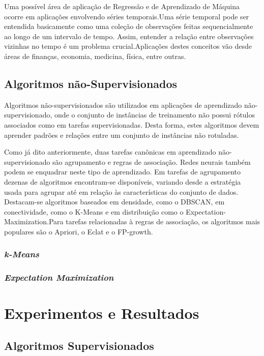 \documentclass{article}
\begin{document}
Uma possível área de aplicação de Regressão e de Aprendizado de Máquina ocorre em aplicações envolvendo séries temporais.Uma série temporal pode ser entendida basicamente como uma coleção de observações feitas sequencialmente ao longo de um intervalo de tempo. Assim, entender a relação entre observações vizinhas no tempo é um problema crucial.Aplicações destes conceitos vão desde áreas de finanças, economia, medicina, física, entre outras.

\subsection{Algoritmos não-Supervisionados}

Algoritmos não-supervisionados são utilizados em aplicações de aprendizado não-supervisionado, onde o conjunto de instâncias de treinamento não possui rótulos associados como em tarefas supervisionadas. Desta forma, estes algoritmos devem aprender padrões e relações entre um conjunto de instâncias não rotuladas.

Como já dito anteriormente, duas tarefas canônicas em aprendizado não-supervisionado são agrupamento e regras de associação. Redes neurais também podem se enquadrar neste tipo de aprendizado. Em tarefas de agrupamento dezenas de algoritmos encontram-se disponíveis, variando desde a estratégia usada para agrupar até em relação às características do conjunto de dados. Destacam-se algoritmos baseados em densidade, como o DBSCAN, em conectividade, como o K-Means e em distribuição como o Expectation-Maximization.Para tarefas relacionadas à regras de associação, os algoritmos mais populares são o Apriori, o Eclat e o FP-growth.  

\subsubsection{{\b \it k-Means}}

\subsubsection{{\b \it Expectation Maximization}}

\section{Experimentos e Resultados}

\subsection{Algoritmos Supervisionados}
\end{document}

